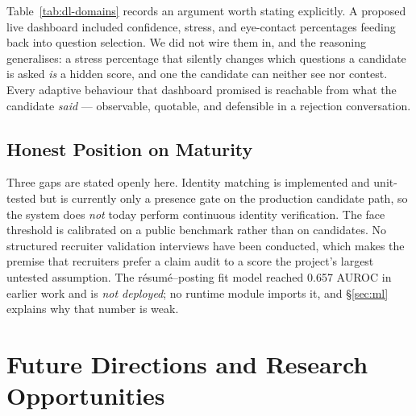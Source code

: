 Table~\ref{tab:dl-domains} records an argument worth stating explicitly. A
proposed live dashboard included confidence, stress, and eye-contact percentages
feeding back into question selection. We did not wire them in, and the reasoning
generalises: a stress percentage that silently changes which questions a
candidate is asked \emph{is} a hidden score, and one the candidate can neither
see nor contest. Every adaptive behaviour that dashboard promised is reachable from what the candidate \emph{said} --- observable, quotable, and defensible in a rejection conversation.

\subsection{Honest Position on Maturity}

Three gaps are stated openly here. Identity matching is implemented and
unit-tested but is currently only a presence gate on the production candidate
path, so the system does \emph{not} today perform continuous identity
verification. The face threshold is calibrated on a public benchmark rather than
on candidates. No structured recruiter validation interviews have been conducted,
which makes the premise that recruiters prefer a claim audit to a score the
project's largest untested assumption. The résumé--posting fit model reached
0.657 AUROC in earlier work and is \emph{not deployed}; no runtime module imports
it, and \S\ref{sec:ml} explains why that number is weak.

\section{Future Directions and Research Opportunities}
\label{sec:future}

